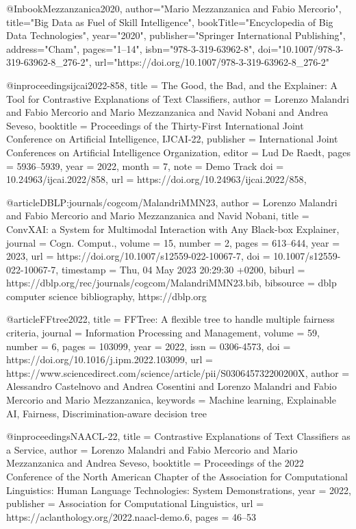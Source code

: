 {@Inbook{Mezzanzanica2020,
author="Mario Mezzanzanica and Fabio Mercorio",
title="Big Data as Fuel of Skill Intelligence",
bookTitle="Encyclopedia of Big Data Technologies",
year="2020",
publisher="Springer International Publishing",
address="Cham",
pages="1--14",
isbn="978-3-319-63962-8",
doi="10.1007/978-3-319-63962-8_276-2",
url="https://doi.org/10.1007/978-3-319-63962-8_276-2"
}


@inproceedings{ijcai2022-858,
  title     = {The Good, the Bad, and the Explainer: A Tool for Contrastive Explanations of Text Classifiers},
  author    = {Lorenzo Malandri and Fabio Mercorio and Mario Mezzanzanica and Navid Nobani and Andrea Seveso},
  booktitle = {Proceedings of the Thirty-First International Joint Conference on
               Artificial Intelligence, {IJCAI-22}},
  publisher = {International Joint Conferences on Artificial Intelligence Organization},
  editor    = {Lud De Raedt},
  pages     = {5936--5939},
  year      = {2022},
  month     = {7},
  note      = {Demo Track}
  doi       = {10.24963/ijcai.2022/858},
  url       = {https://doi.org/10.24963/ijcai.2022/858},
}



@article{DBLP:journals/cogcom/MalandriMMN23,
  author       = {Lorenzo Malandri and
                  Fabio Mercorio and
                  Mario Mezzanzanica and
                  Navid Nobani},
  title        = {ConvXAI: a System for Multimodal Interaction with Any Black-box Explainer},
  journal      = {Cogn. Comput.},
  volume       = {15},
  number       = {2},
  pages        = {613--644},
  year         = {2023},
  url          = {https://doi.org/10.1007/s12559-022-10067-7},
  doi          = {10.1007/s12559-022-10067-7},
  timestamp    = {Thu, 04 May 2023 20:29:30 +0200},
  biburl       = {https://dblp.org/rec/journals/cogcom/MalandriMMN23.bib},
  bibsource    = {dblp computer science bibliography, https://dblp.org}
}

@article{FFtree2022,
title = {FFTree: A flexible tree to handle multiple fairness criteria},
journal = {Information Processing and Management},
volume = {59},
number = {6},
pages = {103099},
year = {2022},
issn = {0306-4573},
doi = {https://doi.org/10.1016/j.ipm.2022.103099},
url = {https://www.sciencedirect.com/science/article/pii/S030645732200200X},
author = {Alessandro Castelnovo and Andrea Cosentini and Lorenzo Malandri and Fabio Mercorio and Mario Mezzanzanica},
keywords = {Machine learning, Explainable AI, Fairness, Discrimination-aware decision tree}
}

@inproceedings{NAACL-22,
    title = {Contrastive Explanations of Text Classifiers as a Service},
    author = {Lorenzo Malandri and Fabio Mercorio and Mario Mezzanzanica and Andrea Seveso},
    booktitle = {Proceedings of the 2022 Conference of the North American Chapter of the Association for Computational Linguistics: Human Language Technologies: System Demonstrations},
    year = {2022},
    publisher = {Association for Computational Linguistics},
    url = {https://aclanthology.org/2022.naacl-demo.6},
    pages = {46--53}
}

}
